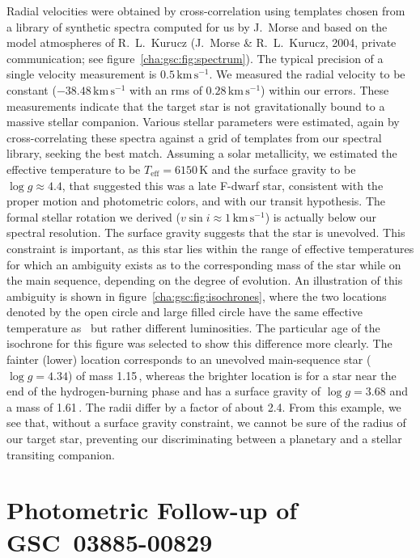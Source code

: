 Radial velocities were obtained by cross-correlation using templates
chosen from a library of synthetic spectra computed for us by J.~Morse
and based on the model atmospheres of R.~L.~Kurucz (J.~Morse \&
R.~L.~Kurucz, 2004, private communication; see figure~\ref{cha:gsc:fig:spectrum}). The typical precision of a
single velocity measurement is $0.5\,\mathrm{km\,s^{-1}}$. We measured
the radial velocity to be constant ($-38.48\,\mathrm{km\,s^{-1}}$ with
an rms of $0.28\,\mathrm{km\,s^{-1}}$) within our errors. These
measurements indicate that the target star is not gravitationally
bound to a massive stellar companion. Various stellar parameters were
estimated, again by cross-correlating these spectra against a grid of
templates from our spectral library, seeking the best match.  Assuming
a solar metallicity, we estimated the effective temperature to be
$T_{\mathrm{eff}}=6150$\,K and the surface gravity to be $\log{g}
\approx 4.4$, that suggested this was a late F-dwarf star, consistent
with the proper motion and photometric colors, and with our transit
hypothesis. The formal stellar rotation we derived ($v\sin{i} \approx
1\,\mathrm{km\,s^{-1}}$) is actually below our spectral
resolution. The surface gravity suggests that the star is unevolved. This
constraint is important, as this star lies within the range of
effective temperatures for which an ambiguity exists as to the
corresponding mass of the star while on the main sequence, depending
on the degree of evolution. An illustration of this ambiguity is shown
in figure~\ref{cha:gsc:fig:isochrones}, where the two locations denoted by the
open circle and large filled circle have the same effective
temperature as \gscOTE\ but rather different luminosities. The particular
age of the isochrone for this figure was selected to show this
difference more clearly. The fainter (lower) location corresponds to
an unevolved main-sequence star ($\log{g}=4.34$) of mass
1.15\,\msun, whereas the brighter location is for a star near the
end of the hydrogen-burning phase and has a surface gravity of
$\log{g}=3.68$ and a mass of 1.61\,\msun. The radii differ by a
factor of about 2.4. From this example, we see that, without a surface
gravity constraint, we cannot be sure of the radius of our target
star, preventing our discriminating between a planetary and a stellar
transiting companion.

\section{Photometric Follow-up of \mbox{GSC 03885-00829}}\label{cha:gsc:sec:photo}

